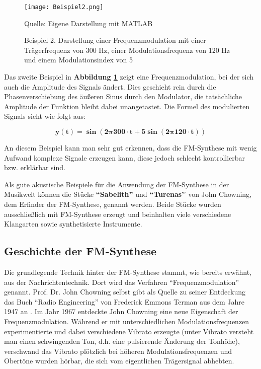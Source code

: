 \begin{figure} [ht]
\centering
  \texttt{[image: Beispiel2.png]}
\caption{Beispiel 2. Darstellung einer Frequenzmodulation mit einer Trägerfrequenz von 300 Hz, einer Modulationsfrequenz von 120 Hz und einem Modulationsindex von 5}
\label{fig:beispiel2}
Quelle: Eigene Darstellung mit MATLAB
\end{figure}

Das zweite Beispiel in \textbf{Abbildung \ref{fig:beispiel2}} zeigt eine Frequenzmodulation, bei der sich auch die Amplitude des Signals ändert. Dies geschieht rein durch die Phasenverschiebung des äußeren Sinus durch den Modulator, die tatsächliche Amplitude der Funktion bleibt dabei unangetastet. Die Formel des modulierten Signals sieht wie folgt aus:

\[
\bm{y(t) = \sin(2 \pmb{\pi} 300\cdot t + 5 \sin(2 \pmb{\pi} 120\cdot t))}
\]

An diesem Beispiel kann man sehr gut erkennen, dass die FM-Synthese mit wenig Aufwand komplexe Signale erzeugen kann, diese jedoch schlecht kontrollierbar bzw. erklärbar sind.

Als gute akustische Beispiele für die Anwendung der FM-Synthese in der Musikwelt können die Stücke \textbf{``Sabelith''} und \textbf{``Turenas'}' von John Chowning, dem Erfinder der FM-Synthese, genannt werden. Beide Stücke wurden ausschließlich mit FM-Synthese erzeugt und beinhalten viele verschiedene Klangarten sowie synthetisierte Instrumente.

\FloatBarrier
\subsection{Geschichte der FM-Synthese}
Die grundlegende Technik hinter der FM-Synthese stammt, wie bereits erwähnt, aus der Nachrichtentechnik. Dort wird das Verfahren ``Frequenzmodulation'' genannt. Prof. Dr. John Chowning selbst gibt als Quelle zu seiner Entdeckung das Buch ``Radio Engineering'' von Frederick Emmons Terman aus dem Jahre 1947 an \cite[S. 35]{soundofinnovation}. Im Jahr 1967 entdeckte John Chowning eine neue Eigenschaft der Frequenzmodulation. Während er mit unterschiedlichen Modulationsfrequenzen experimentierte und dabei verschiedene Vibrato erzeugte (unter Vibrato versteht man einen schwingenden Ton, d.h. eine pulsierende Änderung der Tonhöhe), verschwand das Vibrato plötzlich bei höheren Modulationsfrequenzen und Obertöne wurden hörbar, die sich vom eigentlichen Trägersignal abhebten.\cite{fatherofdigitalmusik}

